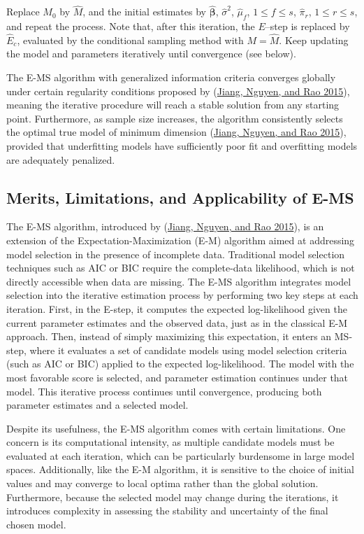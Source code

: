 \documentclass[
  12pt,
]{article}
\begin{document}
Replace \(M_0\) by \(\hat{M}\), and the initial estimates by
\(\hat{\boldsymbol{\beta}}\), \(\hat{\sigma}^2\), \(\hat{\mu}_f\),
\(1 \le f \le s\), \(\hat{\pi}_r\), \(1 \le r \le s\), and repeat the
process. Note that, after this iteration, the \(E\)--step is replaced by
\(\hat{E}_c\), evaluated by the conditional sampling method with
\(M = \hat{M}\). Keep updating the model and parameters iteratively
until convergence (see below).

The E-MS algorithm with generalized information criteria converges
globally under certain regularity conditions proposed by
(\protect\hyperlink{ref-Sunilems}{Jiang, Nguyen, and Rao 2015}), meaning
the iterative procedure will reach a stable solution from any starting
point. Furthermore, as sample size increases, the algorithm consistently
selects the optimal true model of minimum dimension
(\protect\hyperlink{ref-Sunilems}{Jiang, Nguyen, and Rao 2015}),
provided that underfitting models have sufficiently poor fit and
overfitting models are adequately penalized.

\subsection{Merits, Limitations, and Applicability of E-MS}

The E-MS algorithm, introduced by
(\protect\hyperlink{ref-Sunilems}{Jiang, Nguyen, and Rao 2015}), is an
extension of the Expectation-Maximization (E-M) algorithm aimed at
addressing model selection in the presence of incomplete data.
Traditional model selection techniques such as AIC or BIC require the
complete-data likelihood, which is not directly accessible when data are
missing. The E-MS algorithm integrates model selection into the
iterative estimation process by performing two key steps at each
iteration. First, in the E-step, it computes the expected log-likelihood
given the current parameter estimates and the observed data, just as in
the classical E-M approach. Then, instead of simply maximizing this
expectation, it enters an MS-step, where it evaluates a set of candidate
models using model selection criteria (such as AIC or BIC) applied to
the expected log-likelihood. The model with the most favorable score is
selected, and parameter estimation continues under that model. This
iterative process continues until convergence, producing both parameter
estimates and a selected model.

Despite its usefulness, the E-MS algorithm comes with certain
limitations. One concern is its computational intensity, as multiple
candidate models must be evaluated at each iteration, which can be
particularly burdensome in large model spaces. Additionally, like the
E-M algorithm, it is sensitive to the choice of initial values and may
converge to local optima rather than the global solution. Furthermore,
because the selected model may change during the iterations, it
introduces complexity in assessing the stability and uncertainty of the
final chosen model.
\end{document}

